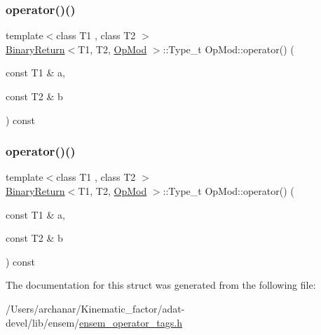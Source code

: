 \mbox{\label{structOpMod_a76039bd668de4b56b48f8d9c64bebce4}} 
\subsubsection{\texorpdfstring{operator()()}{operator()()}\hspace{0.1cm}{\footnotesize\ttfamily [2/3]}}
{\footnotesize\ttfamily template$<$class T1 , class T2 $>$ \\
\mbox{\hyperlink{structBinaryReturn}{Binary\+Return}}$<$T1, T2, \mbox{\hyperlink{structOpMod}{Op\+Mod}} $>$\+::Type\+\_\+t Op\+Mod\+::operator() (\begin{DoxyParamCaption}\item[{const T1 \&}]{a,  }\item[{const T2 \&}]{b }\end{DoxyParamCaption}) const\hspace{0.3cm}{\ttfamily [inline]}}

\mbox{\label{structOpMod_a76039bd668de4b56b48f8d9c64bebce4}} 
\subsubsection{\texorpdfstring{operator()()}{operator()()}\hspace{0.1cm}{\footnotesize\ttfamily [3/3]}}
{\footnotesize\ttfamily template$<$class T1 , class T2 $>$ \\
\mbox{\hyperlink{structBinaryReturn}{Binary\+Return}}$<$T1, T2, \mbox{\hyperlink{structOpMod}{Op\+Mod}} $>$\+::Type\+\_\+t Op\+Mod\+::operator() (\begin{DoxyParamCaption}\item[{const T1 \&}]{a,  }\item[{const T2 \&}]{b }\end{DoxyParamCaption}) const\hspace{0.3cm}{\ttfamily [inline]}}



The documentation for this struct was generated from the following file\+:\begin{DoxyCompactItemize}
\item 
/\+Users/archanar/\+Kinematic\+\_\+factor/adat-\/devel/lib/ensem/\mbox{\hyperlink{adat-devel_2lib_2ensem_2ensem__operator__tags_8h}{ensem\+\_\+operator\+\_\+tags.\+h}}\end{DoxyCompactItemize}
